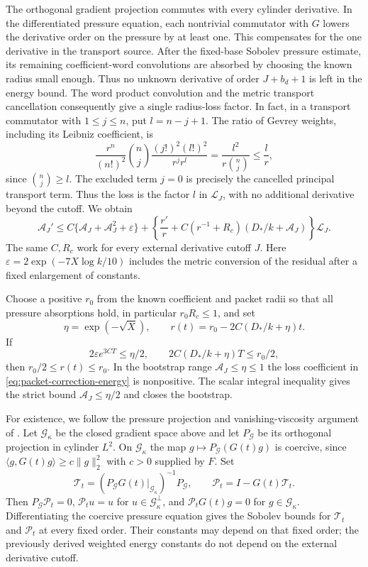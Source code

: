 \documentclass[11pt]{article}
\theoremstyle{definition}
\begin{document}
The orthogonal gradient projection commutes with every cylinder
derivative. In the differentiated pressure equation, each nontrivial
commutator with $G$ lowers the derivative order on the pressure by at
least one. This compensates for the one derivative in the transport
source. After the fixed-base Sobolev pressure estimate, its remaining
coefficient-word convolutions are absorbed by choosing the known radius
small enough. Thus no unknown derivative of order $J+b_d+1$ is left in
the energy bound. The word product convolution and the metric transport
cancellation consequently give a single radius-loss factor. In fact, in
a transport commutator with $1\le j\le n$, put $l=n-j+1$. The ratio of
Gevrey weights, including its Leibniz coefficient, is
\[
 \frac{r^n}{(n!)^2}\binom nj
   \frac{(j!)^2(l!)^2}{r^j r^l}
   =\frac{l^2}{r\binom nj}\le\frac lr,
\]
since $\binom nj\ge l$. The excluded term $j=0$ is precisely the
cancelled principal transport term. Thus the loss is the factor $l$
in $\mathcal L_J$, with no additional derivative beyond the cutoff. We obtain
\begin{equation}\label{eq:packet-correction-energy}
 \mathcal A_J'
 \le C\{\mathcal A_J+\mathcal A_J^2+\varepsilon\}
  +\left\{\frac{r'}{r}
       +C(r^{-1}+R_c)(D_*/k+\mathcal A_J)\right\}\mathcal L_J.
\end{equation}
The same $C,R_c$ work for every external derivative cutoff $J$.
Here $\varepsilon=2\exp(-7X\log k/10)$ includes the metric conversion
of the residual after a fixed enlargement of constants.

Choose a positive $r_0$ from the known coefficient and packet radii so
that all pressure absorptions hold, in particular $r_0R_c\le1$, and set
\[
 \eta=\exp(-\sqrt X),\qquad
 r(t)=r_0-2C(D_*/k+\eta)t.
\]
If
\begin{equation}\label{eq:packet-correction-guards}
 2\varepsilon e^{3CT}\le\eta/2,
 \qquad 2C(D_*/k+\eta)T\le r_0/2,
\end{equation}
then $r_0/2\le r(t)\le r_0$. In the bootstrap range
$\mathcal A_J\le\eta\le1$ the loss coefficient in
\eqref{eq:packet-correction-energy} is nonpositive. The scalar integral
inequality gives the strict bound $\mathcal A_J\le\eta/2$ and closes
the bootstrap.

For existence, we follow the pressure projection
and vanishing-viscosity argument of \cite[\S3.6]{OAI}. Let
$\mathscr G_\kappa$ be the closed gradient space above and let
$P_{\mathscr G}$ be its orthogonal projection in cylinder $L^2$.
On $\mathscr G_\kappa$ the map
$g\mapsto P_{\mathscr G}(G(t)g)$ is coercive, since
$\langle g,G(t)g\rangle\ge c\|g\|_2^2$ with $c>0$ supplied by $F$.
Set
\[
 \mathcal T_t=(P_{\mathscr G}G(t)|_{\mathscr G_\kappa})^{-1}
                         P_{\mathscr G},\qquad
 \mathcal P_t=I-G(t)\mathcal T_t.
\]
Then $P_{\mathscr G}\mathcal P_t=0$,
$\mathcal P_tu=u$ for $u\in\mathscr G_\kappa^\perp$, and
$\mathcal P_tG(t)g=0$ for $g\in\mathscr G_\kappa$.
Differentiating the coercive pressure equation gives the Sobolev bounds
for $\mathcal T_t$ and $\mathcal P_t$ at every fixed order. Their constants
may depend on that fixed order; the previously derived weighted energy
constants do not depend on the external derivative cutoff.
\end{document}
